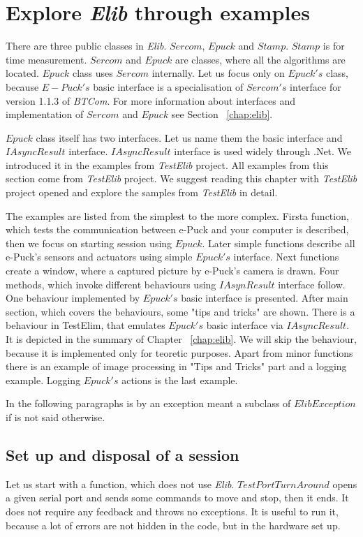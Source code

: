\section{Explore {\it Elib} through examples} \label{sec:interfaces}
  There are three public classes in {\it Elib}. $Sercom$, $Epuck$ and $Stamp$.
  $Stamp$ is for time measurement. $Sercom$ and $Epuck$ are classes, where all the algorithms are located.
  $Epuck$ class uses $Sercom$ internally.
  Let us focus only on $Epuck's$ class, because $E-Puck's$ basic interface is a specialisation of $Sercom's$
  interface for version 1.1.3 of {\it BTCom}.
  For more information about interfaces and implementation of $Sercom$ and $Epuck$ see Section ~\ref{chap:elib}.

  $Epuck$ class itself has two interfaces. Let us name them the basic interface and $IAsyncResult$ interface.
  $IAsyncResult$ interface is used widely through .Net. We introduced it in the examples from {\it TestElib} project.
  All examples from this section come from {\it TestElib} project. We suggest reading this chapter with {\it TestElib} project opened
  and explore the samples from {\it TestElib} in detail.

  The examples are listed from the simplest to the more complex. 
  Firsta function, which tests the communication between e-Puck and your computer is described,
  then we focus on starting session using $Epuck$.
  Later simple functions describe all e-Puck's sensors and actuators using simple $Epuck's$ interface.
  Next functions create a window, where a captured picture by e-Puck's camera is drawn.
  Four methods, which invoke different behaviours using $IAsynResult$ interface follow.
  One behaviour implemented by $Epuck's$ basic interface is presented.
  After main section, which covers the behaviours, some "tips and tricks" are shown.
  There is a behaviour in TestElim, that emulates $Epuck's$ basic interface via $IAsyncResult$. 
  It is depicted in the summary of Chapter ~\ref{chap:elib}.
  We will skip the behaviour, because it is implemented only for teoretic purposes.
  Apart from minor functions there is an example of image processing in "Tips and Tricks" part and a logging example.
  Logging $Epuck's$ actions is the last example.

  In the following paragraphs is by an exception meant a subclass of $ElibException$ if is not said otherwise.
\subsection{Set up and disposal of a session}\label{sec:session}
  Let us start with a function, which does not use {\it Elib}. $TestPortTurnAround$ opens a given serial port
  and sends some commands to move and stop, then it ends. It does not require any feedback and throws no exceptions.
  It is useful to run it, because a lot of errors are not hidden in the code, but in the hardware set up.

